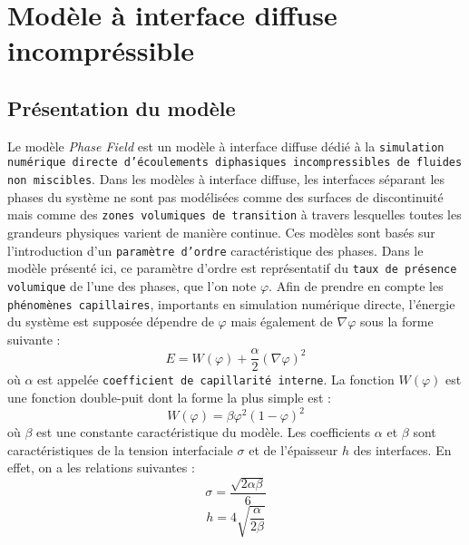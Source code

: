 \newpage
{}
\chapter{\label{sec:FT}Mod\`ele \`a interface diffuse incompr\'essible}

\section{Pr\'esentation du mod\`ele}
Le mod\`ele \textit{Phase Field} est un mod\`ele \`a interface diffuse d\'edi\'e
\`a la \texttt{simulation num\'erique directe d'\'ecoulements diphasiques
incompressibles de fluides non miscibles}. Dans les mod\`eles \`a interface
diffuse, les interfaces s\'eparant les phases du syst\`eme ne sont pas
mod\'elis\'ees comme des surfaces de discontinuit\'e mais comme des
\texttt{zones volumiques de transition} \`a travers lesquelles toutes les
grandeurs physiques varient de mani\`ere continue. Ces mod\`eles sont bas\'es
sur l'introduction d'un \texttt{param\`etre d'ordre} caract\'eristique des
phases. Dans le mod\`ele pr\'esent\'e ici,  ce param\`etre d'ordre est
repr\'esentatif du \texttt{taux de pr\'esence volumique} de l'une des phases,
que l'on note $\varphi$. Afin de prendre en compte les \texttt{ph\'enom\`enes
capillaires}, importants en simulation num\'erique directe, l'\'energie du
syst\`eme est suppos\'ee d\'ependre de $\varphi$ mais \'egalement de $\nabla
\varphi$ sous la forme suivante :
\begin{equation}
E = W\left(\varphi\right)+\frac{\alpha}{2}\left(\nabla \varphi\right)^2
\end{equation}
o\`u $\alpha$ est appel\'ee \texttt{coefficient de capillarit\'e interne}. La
fonction $W\left(\varphi\right)$ est une fonction double-puit dont la forme la plus
simple est :
\begin{equation}
W\left(\varphi\right)=\beta\varphi^2\left(1-\varphi\right)^2
\end{equation}
o\`u $\beta$ est une constante caract\'eristique du mod\`ele.\newline
Les coefficients $\alpha$ et $\beta$ sont caract\'eristiques de la tension
interfaciale $\sigma$ et de l'\'epaisseur $h$ des interfaces. En effet, on a les
relations suivantes :
\begin{equation}
\sigma=\frac{\sqrt{2\alpha\beta}}{6}
\end{equation}
\begin{equation}
h=4\sqrt{\frac{\alpha}{2\beta}}
\end{equation}

